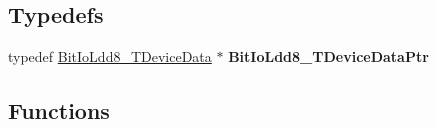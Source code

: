 \subsection*{Typedefs}
\begin{DoxyCompactItemize}
\item 
\hypertarget{group___bit_io_ldd8__module_ga15ad71fd17a93acae29991214dd2a2bd}{typedef \hyperlink{struct_bit_io_ldd8___t_device_data}{Bit\-Io\-Ldd8\-\_\-\-T\-Device\-Data} $\ast$ {\bfseries Bit\-Io\-Ldd8\-\_\-\-T\-Device\-Data\-Ptr}}\label{group___bit_io_ldd8__module_ga15ad71fd17a93acae29991214dd2a2bd}

\end{DoxyCompactItemize}
\subsection*{Functions}
